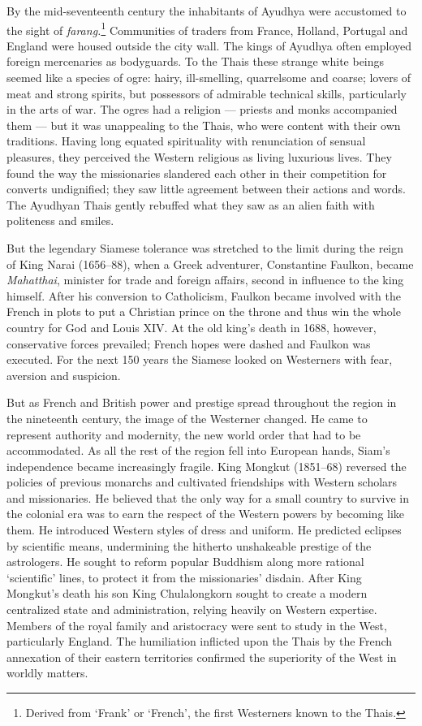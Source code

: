 By the mid-seventeenth century the inhabitants of Ayudhya were
accustomed to the sight of \emph{farang.}\footnote{Derived from `Frank'
  or `French', the first Westerners known to the Thais.} Communities of
traders from France, Holland, Portugal and England were housed outside
the city wall. The kings of Ayudhya often employed foreign mercenaries
as bodyguards. To the Thais these strange white beings seemed like a
species of ogre: hairy, ill-smelling, quarrelsome and coarse; lovers of
meat and strong spirits, but possessors of admirable technical skills,
particularly in the arts of war. The ogres had a religion --- priests
and monks accompanied them --- but it was unappealing to the Thais, who
were content with their own traditions. Having long equated spirituality
with renunciation of sensual pleasures, they perceived the Western
religious as living luxurious lives. They found the way the missionaries
slandered each other in their competition for converts undignified; they
saw little agreement between their actions and words. The Ayudhyan Thais
gently rebuffed what they saw as an alien faith with politeness and
smiles.

But the legendary Siamese tolerance was stretched to the limit during
the reign of King Narai (1656--88), when a Greek adventurer, Constantine
Faulkon, became \emph{Mahatthai}, minister for trade and foreign
affairs, second in influence to the king himself. After his conversion
to Catholicism, Faulkon became involved with the French in plots to put
a Christian prince on the throne and thus win the whole country for God
and Louis XIV. At the old king's death in 1688, however, conservative
forces prevailed; French hopes were dashed and Faulkon was executed. For
the next 150 years the Siamese looked on Westerners with fear, aversion
and suspicion.

But as French and British power and prestige spread throughout the
region in the nineteenth century, the image of the Westerner changed. He
came to represent authority and modernity, the new world order that had
to be accommodated. As all the rest of the region fell into European
hands, Siam's independence became increasingly fragile. King Mongkut
(1851--68) reversed the policies of previous monarchs and cultivated
friendships with Western scholars and missionaries. He believed that the
only way for a small country to survive in the colonial era was to earn
the respect of the Western powers by becoming like them. He introduced
Western styles of dress and uniform. He predicted eclipses by scientific
means, undermining the hitherto unshakeable prestige of the astrologers.
He sought to reform popular Buddhism along more rational `scientific'
lines, to protect it from the missionaries' disdain. After King
Mongkut's death his son King Chulalongkorn sought to create a modern
centralized state and administration, relying heavily on Western
expertise. Members of the royal family and aristocracy were sent to
study in the West, particularly England. The humiliation inflicted upon
the Thais by the French annexation of their eastern territories
confirmed the superiority of the West in worldly matters.

